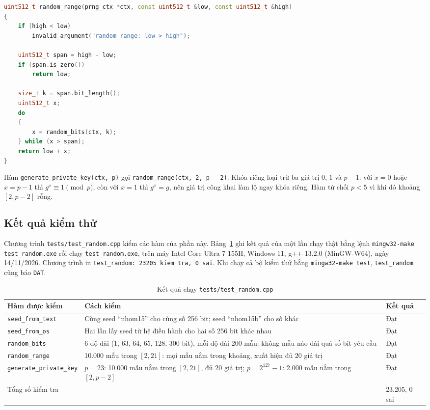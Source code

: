 \begin{lstlisting}[language=C++, caption={Hàm \texttt{random\_range} trong \texttt{src/random.cpp} (bỏ chú thích)}, label={lst:random-range}]
uint512_t random_range(prng_ctx *ctx, const uint512_t &low, const uint512_t &high)
{
    if (high < low)
        invalid_argument("random_range: low > high");

    uint512_t span = high - low;
    if (span.is_zero())
        return low;

    size_t k = span.bit_length();
    uint512_t x;
    do
    {
        x = random_bits(ctx, k);
    } while (x > span);
    return low + x;
}
\end{lstlisting}

Hàm \texttt{generate\_\allowbreak{}private\_\allowbreak{}key(ctx, p)} gọi \texttt{random\_\allowbreak{}range(ctx, 2, p - 2)}. Khóa riêng loại trừ ba giá trị $0$, $1$ và $p - 1$: với $x = 0$ hoặc $x = p - 1$ thì $g^x \equiv 1 \pmod p$, còn với $x = 1$ thì $g^x = g$, nên giá trị công khai làm lộ ngay khóa riêng. Hàm từ chối $p < 5$ vì khi đó khoảng $[2, p - 2]$ rỗng.

\subsection{Kết quả kiểm thử}

Chương trình \texttt{tests/\allowbreak{}test\_\allowbreak{}random.cpp} kiểm các hàm của phần này. Bảng~\ref{tab:csprng-eval} ghi kết quả của một lần chạy thật bằng lệnh \texttt{mingw32-make test\_\allowbreak{}random.exe} rồi chạy \texttt{test\_\allowbreak{}random.exe}, trên máy Intel Core Ultra 7 155H, Windows 11, g++ 13.2.0 (MinGW-W64), ngày 14/11/2026. Chương trình in \texttt{test\_\allowbreak{}random: 23205 kiem tra, 0 sai}. Khi chạy cả bộ kiểm thử bằng \texttt{mingw32-make test}, \texttt{test\_\allowbreak{}random} cũng báo \texttt{DAT}.

\begin{table}[h!]
\centering
\small
\begin{tabular}{p{4.2cm}p{7.0cm}p{2cm}}
\toprule
\textbf{Hàm được kiểm} & \textbf{Cách kiểm} & \textbf{Kết quả} \\
\midrule
\texttt{seed\_from\_text} & Cùng seed ``nhom15'' cho cùng số 256 bit; seed ``nhom15b'' cho số khác & Đạt \\
\texttt{seed\_from\_os} & Hai lần lấy seed từ hệ điều hành cho hai số 256 bit khác nhau & Đạt \\
\texttt{random\_bits} & 6 độ dài (1, 63, 64, 65, 128, 300 bit), mỗi độ dài 200 mẫu: không mẫu nào dài quá số bit yêu cầu & Đạt \\
\texttt{random\_range} & 10.000 mẫu trong $[2, 21]$: mọi mẫu nằm trong khoảng, xuất hiện đủ 20 giá trị & Đạt \\
\texttt{generate\_private\_key} & $p = 23$: 10.000 mẫu nằm trong $[2, 21]$, đủ 20 giá trị; $p = 2^{127} - 1$: 2.000 mẫu nằm trong $[2, p - 2]$ & Đạt \\
\midrule
\multicolumn{2}{l}{Tổng số kiểm tra} & 23.205, 0 sai \\
\bottomrule
\end{tabular}
\caption{Kết quả chạy \texttt{tests/test\_random.cpp}}
\label{tab:csprng-eval}
\end{table}

